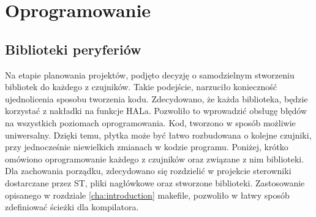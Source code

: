 \section{Oprogramowanie}
\subsection{Biblioteki peryferiów}
Na etapie planowania projektów, podjęto decyzję o samodzielnym stworzeniu bibliotek do każdego z czujników. Takie podejście, narzuciło konieczność ujednolicenia sposobu tworzenia kodu. Zdecydowano, że każda biblioteka, będzie korzystać z nakładki na funkcje HALa. Pozwoliło to wprowadzić obsługę błędów na wszystkich poziomach oprogramowania. Kod, tworzono w sposób możliwie uniwersalny. Dzięki temu, płytka może być łatwo rozbudowana o kolejne czujniki, przy jednocześnie niewielkich zmianach w kodzie programu. Poniżej, krótko omówiono oprogramowanie każdego z czujników oraz związane z nim biblioteki. Dla zachowania porządku, zdecydowano się rozdzielić w projekcie sterowniki dostarczane przez ST, pliki nagłówkowe oraz stworzone biblioteki. Zastosowanie opisanego w rozdziale \ref{cha:introduction} makefile, pozwoliło w łatwy sposób zdefiniować ścieżki dla kompilatora.
\newline
\newline

